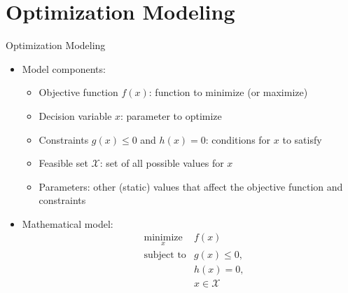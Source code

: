 \documentclass [xcolor=svgnames, handout]{beamer}
\begin{document}
\section{Optimization Modeling}
\begin{frame}{Optimization Modeling}
    \begin{itemize}[<+->]
        \item Model components:
        \begin{itemize}[<+->]
            \item Objective function $f(x)$: function to minimize (or maximize)
            \item Decision variable $x$: parameter to optimize
            \item Constraints $g(x) \leq 0$ and $h(x) = 0$: conditions for $x$ to satisfy
            \item Feasible set $\mathcal{X}$: set of all possible values for $x$
            \item Parameters: other (static) values that affect the objective function and constraints
        \end{itemize}
        
        \item Mathematical model:
            \begin{equation}
                \begin{aligned}
                    & \underset{x}{\text{minimize}}
                    & f(x) \\
                    & \text{subject to}
                    & g(x) \leq 0, \\
                    & & h(x) = 0, \\
                    & & x \in \mathcal{X}
                \end{aligned}
                \label{eq:basic_optimization}
            \end{equation}            
    \end{itemize}
\end{frame}
\end{document}
